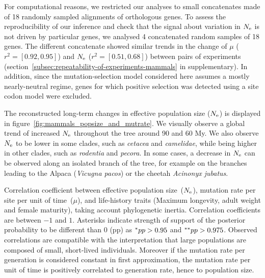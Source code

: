 For computational reasons, we restricted our analyses to small concatenates made of 18 randomly sampled alignments of orthologous genes.
To assess the reproducibility of our inference and check that the signal about variation in $N_{\text{e}}$ is not driven by particular genes, we analysed 4 concatenated random samples of 18 genes.
The different concatenate showed similar trends in the change of $\mu$ ($r^2=[0.92,0.95]$) and $N_{\text{e}}$ ($r^2=[0.51,0.68]$) between pairs of experiments (section~\ref{subsec:repeatability-of-experiments-mammals} in supplementary).
In addition, since the mutation-selection model considered here assumes a mostly \gls{nearly-neutral} regime, genes for which positive selection was detected using a site \gls{codon} model were excluded.

The reconstructed long-term changes in \gls{effective population size} ($N_{\text{e}}$) is displayed in figure~\ref{fig:mammals_popsize_and_mutrate}.
We visually observe a global trend of increased $N_{\text{e}}$ throughout the tree around 90 and 60 My.
We also observe $N_{\text{e}}$ to be lower in some clades, such as \textit{cetacea} and \textit{camelidae}, while being higher in other clades, such as \textit{rodentia} and \textit{pecora}.
In some cases, a decrease in $N_{\text{e}}$ can be observed along an isolated branch of the tree, for example on the branches leading to the Alpaca (\textit{Vicugna pacos}) or the cheetah \textit{Acinonyx jubatus}.

\begin{table}[htbp]
    
    \caption[Traits correlation in mammals]{
    Correlation coefficient between effective population size~($N_{\text{e}}$), mutation rate per site per unit of time~($\mu$), and life-history traits (Maximum longevity, adult weight and female maturity), taking account phylogenetic inertia.
    Correlation coefficients are between $-1$ and $1$.
    Asterisks indicate strength of support of the \gls{posterior} probability to be different than $0$ (pp) as $\smash{^{*}} pp > 0.95$ and $\smash{^{**}} pp > 0.975$.
    Observed correlations are compatible with the interpretation that large populations are composed of small, short-lived individuals.
    Moreover if the mutation rate per generation is considered constant in first approximation, the mutation rate per unit of time is positively correlated to generation rate, hence to population size.
    }
    \label{tab:mammals_correlation}
\end{table}

